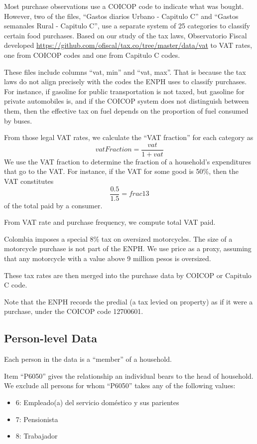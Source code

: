 \documentclass[12pt]{article}
\begin{document}
\begin{appendices}
Most purchase observations use a COICOP code to indicate what was bought.
However, two of the files, ``Gastos diarios Urbano - Capitulo C'' and
``Gastos semanales Rural - Capitulo C'',
use a separate system of 25 categories to classify certain food purchases.
Based on our study of the tax laws,
Observatorio Fiscal developed \href{two bridges}{https://github.com/ofiscal/tax.co/tree/master/data/vat}
to VAT rates, one from COICOP codes and one from Capitulo C codes.

These files include columns ``vat, min'' and ``vat, max''.
That is because the tax laws do not align precisely with the codes the ENPH uses to classify purchases.
For instance, if gasoline for public transportation is not taxed, but gasoline for private automobiles is, and if the COICOP system does not distinguish between them, then the effective tax on fuel depends on the proportion of fuel consumed by buses.

From those legal VAT rates, we calculate the ``VAT fraction'' for each category as
\begin{equation}
  vatFraction = \frac{vat}{1 + vat}
\end{equation}
We use the VAT fraction to determine the fraction of a household's expenditures that go to the VAT.
For instance, if the VAT for some good is 50\%, then the VAT constitutes
\begin{equation}
  \frac{0.5}{1.5} = frac{1}{3}
\end{equation}
of the total paid by a consumer.

From VAT rate and purchase frequency, we compute total VAT paid.

Colombia imposes a special 8\% tax on oversized motorcycles.
The size of a motorcycle purchase is not part of the ENPH.
We use price as a proxy, assuming that any motorcycle with a value above 9
million pesos is oversized.

These tax rates are then merged into the purchase data by COICOP or Capitulo C code.

Note that the ENPH records the predial (a tax levied on property)
as if it were a purchase, under the COICOP code 12700601.


\subsection{Person-level Data}
Each person in the data is a ``member'' of a household.

Item ``P6050'' gives the relationship an individual bears to the head of household.
We exclude all persons for whom ``P6050'' takes any of the following values:
\begin{itemize}
\item 6: Empleado(a) del servicio doméstico y sus parientes
\item 7: Pensionista
\item 8: Trabajador
\end{itemize}


\end{appendices}
\end{document}
